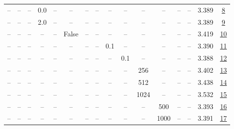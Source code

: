 \begin{table}[H]
\begin{tabular}{cccccccccccccccc}
-- & -- & -- & 0.0 & -- & -- & -- & -- & -- & -- & -- & -- & -- & -- & 3.389 & \href{https://wandb.ai/marin-community/optimizer-scaling/runs/sweep-130m-5B-kron4df384lr0.002-wd0.5-b10.95-plr0.2-pis1-gn0.0-n-447d9f}{8} \\
-- & -- & -- & 2.0 & -- & -- & -- & -- & -- & -- & -- & -- & -- & -- & 3.389 & \href{https://wandb.ai/marin-community/optimizer-scaling/runs/sweep-130m-5B-krondd6d9blr0.002-wd0.5-b10.95-plr0.2-pis1-gn2.0-n-552b0d}{9} \\
-- & -- & -- & -- & -- & False & -- & -- & -- & -- & -- & -- & -- & -- & 3.419 & \href{https://wandb.ai/marin-community/optimizer-scaling/runs/sweep-130m-5B-krone5b648lr0.002-wd0.5-b10.95-plr0.2-pis1-gn1-nor-3d80f2}{10} \\
-- & -- & -- & -- & -- & -- & -- & -- & 0.1 & -- & -- & -- & -- & -- & 3.390 & \href{https://wandb.ai/marin-community/optimizer-scaling/runs/sweep-130m-5B-kronb4e3a9lr0.002-wd0.5-b10.95-plr0.1-pis1-gn1-nor-b5c63e}{11} \\
-- & -- & -- & -- & -- & -- & -- & -- & -- & 0.1 & -- & -- & -- & -- & 3.388 & \href{https://wandb.ai/marin-community/optimizer-scaling/runs/sweep-130m-5B-kron856f4elr0.002-wd0.5-b10.95-plr0.2-pis1-gn1-nor-9bbacc}{12} \\
-- & -- & -- & -- & -- & -- & -- & -- & -- & -- & 256 & -- & -- & -- & 3.402 & \href{https://wandb.ai/marin-community/optimizer-scaling/runs/sweep-130m-5B-kronf8119alr0.002-wd0.5-b10.95-plr0.2-pis1-gn1-nor-73cf68}{13} \\
-- & -- & -- & -- & -- & -- & -- & -- & -- & -- & 512 & -- & -- & -- & 3.438 & \href{https://wandb.ai/marin-community/optimizer-scaling/runs/sweep-130m-5B-kron80879elr0.002-wd0.5-b10.95-plr0.2-pis1-gn1-nor-57a36a}{14} \\
-- & -- & -- & -- & -- & -- & -- & -- & -- & -- & 1024 & -- & -- & -- & 3.532 & \href{https://wandb.ai/marin-community/optimizer-scaling/runs/sweep-130m-5B-kron897453lr0.002-wd0.5-b10.95-plr0.2-pis1-gn1-nor-92b5b8}{15} \\
-- & -- & -- & -- & -- & -- & -- & -- & -- & -- & -- & 500 & -- & -- & 3.393 & \href{https://wandb.ai/marin-community/optimizer-scaling/runs/sweep-130m-5B-kron5226b3lr0.002-wd0.5-b10.95-plr0.2-pis1-gn1-nor-49e5be}{16} \\
-- & -- & -- & -- & -- & -- & -- & -- & -- & -- & -- & 1000 & -- & -- & 3.391 & \href{https://wandb.ai/marin-community/optimizer-scaling/runs/sweep-130m-5B-kron0c9405lr0.002-wd0.5-b10.95-plr0.2-pis1-gn1-nor-d2903e}{17} \\

\end{tabular}
\end{table}
